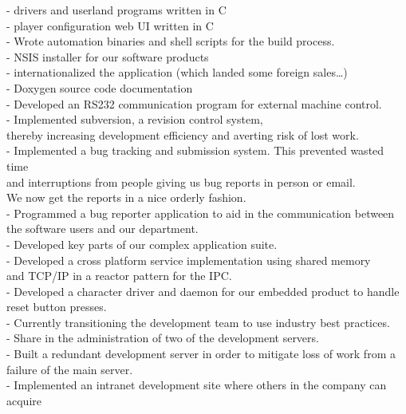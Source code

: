 \begin{entrylist}
{        - drivers and userland programs written in C\\
        - player configuration web UI written in C\\
        - Wrote automation binaries and shell scripts for the build process.\\
        - NSIS installer for our software products\\
        - internationalized the application (which landed some foreign sales…)\\
        - Doxygen source code documentation\\
        - Developed an RS232 communication program for external machine control.\\
        - Implemented subversion, a revision control system,\\
          thereby increasing development efficiency and averting risk of lost work.\\
        - Implemented a bug tracking and submission system. This prevented wasted time\\
        and interruptions from people giving us bug reports in person or email.\\
        We now get the reports in a nice orderly fashion.\\
        - Programmed a bug reporter application to aid in the communication between\\
        the software users and our department.\\
        - Developed key parts of our complex application suite.\\
        - Developed a cross platform service implementation using shared memory\\
        and TCP/IP in a reactor pattern for the IPC.\\
        - Developed a character driver and daemon for our embedded product to handle\\
        reset button presses.\\
        - Currently transitioning the development team to use industry best practices.\\
        - Share in the administration of two of the development servers.\\
        - Built a redundant development server in order to mitigate loss of work from a\\
        failure of the main server.\\
        - Implemented an intranet development site where others in the company can acquire\\
}
\end{entrylist}
